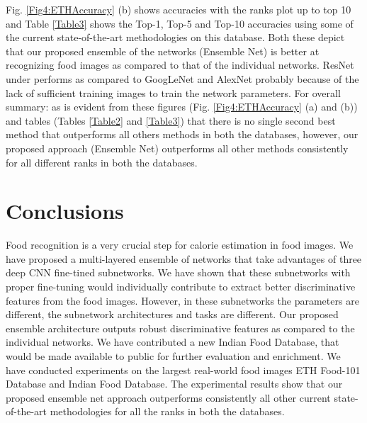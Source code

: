 \documentclass[journal]{IEEEtran}%
\begin{document}
Fig. \ref{Fig4:ETHAccuracy} (b) shows accuracies with the ranks plot up to top 10 and Table \ref{Table3} shows the Top-1, Top-5 and Top-10 accuracies using some of the current state-of-the-art methodologies on this database. Both these depict that our proposed ensemble of the networks (Ensemble Net) is better at recognizing food images as compared to that of the individual networks. ResNet under performs as compared to GoogLeNet and AlexNet probably because of the lack of sufficient training images to train the network parameters. For overall summary: as is evident from these figures (Fig. \ref{Fig4:ETHAccuracy} (a) and (b)) and tables (Tables \ref{Table2} and \ref{Table3}) that there is no single second best method that outperforms all others methods in both the databases, however, our proposed approach (Ensemble Net) outperforms all other methods consistently for all different ranks in both the databases.



\section{Conclusions}
Food recognition is a very crucial step for calorie estimation in food images. We have proposed a multi-layered ensemble of networks that take advantages of three deep CNN fine-tined subnetworks. We have shown that these subnetworks with proper fine-tuning would individually contribute to extract better discriminative features from the food images. However, in these subnetworks the parameters are different, the subnetwork architectures and tasks are different. Our proposed ensemble architecture outputs robust discriminative features as compared to the individual networks. We have contributed a new Indian Food Database, that would be made available to public for further evaluation and enrichment. We have conducted experiments on the largest real-world food images ETH Food-101 Database and Indian Food Database. The experimental results show that our proposed ensemble net approach outperforms consistently all other current state-of-the-art methodologies for all the ranks in both the databases.
\end{document}
